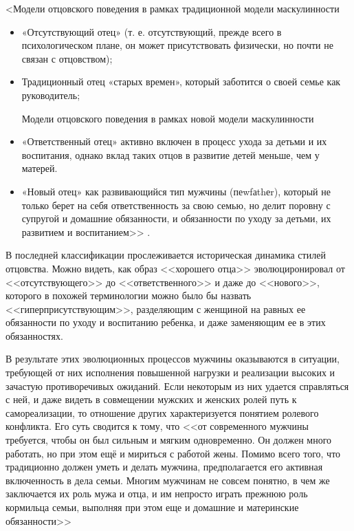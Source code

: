 \documentclass{../../common/thesisbyxetex}
\begin{document}
<Модели отцовского поведения в рамках традиционной модели маскулинности

\begin{itemize}

	\item «Отсутствующий отец» (т. е. отсутствующий, прежде всего в психологическом плане, он может
присутствовать физически, но почти не связан с отцовством);

\item Традиционный отец «старых времен», который заботится о своей семье как руководитель;

Модели отцовского поведения в рамках новой модели маскулинности
	\item «Ответственный отец» активно включен в процесс ухода за детьми и их воспитания, однако
вклад таких
отцов в развитие детей меньше, чем у матерей.
	\item «Новый отец» как развивающийся тип мужчины (пеwfаthеr), который не только берет на себя
ответственность за свою семью, но делит поровну с супругой и домашние обязанности, и обязанности по
уходу за детьми, их развитием и воспитанием>> \cite{clec}.

\end{itemize}

В последней классификации прослеживается историческая динамика стилей отцовства. Можно видеть, как
образ <<хорошего отца>> эволюциронировал от <<отсутствующего>>
до <<ответственного>> и даже до <<нового>>, которого в похожей терминологии можно было бы назвать
<<гиперприсутствующим>>, разделяющим с женщиной на равных ее обязанности по уходу и воспитанию
ребенка, и даже заменяющим ее в этих обязанностях.

В результате этих эволюционных процессов мужчины оказываются в ситуации, требующей от них
исполнения повышенной нагрузки и
реализации высоких и зачастую противоречивых ожиданий. Если некоторым из них удается справляться с
ней, и даже видеть в совмещении мужских и женских ролей путь к самореализации, то отношение других
характеризуется понятием ролевого конфликта. Его суть сводится к тому, что <<от современного мужчины
требуется, чтобы он был сильным и
мягким одновременно. Он должен много работать, но при этом ещё и мириться с работой
жены. Помимо всего того, что традиционно должен уметь и делать мужчина,
предполагается его активная включенность в дела семьи. Многим мужчинам не совсем
понятно, в чем же заключается их роль мужа и отца, и им непросто играть прежнюю роль
кормильца семьи, выполняя при этом еще и домашние и материнские обязанности>> \cite[112]{confl}
\end{document}
